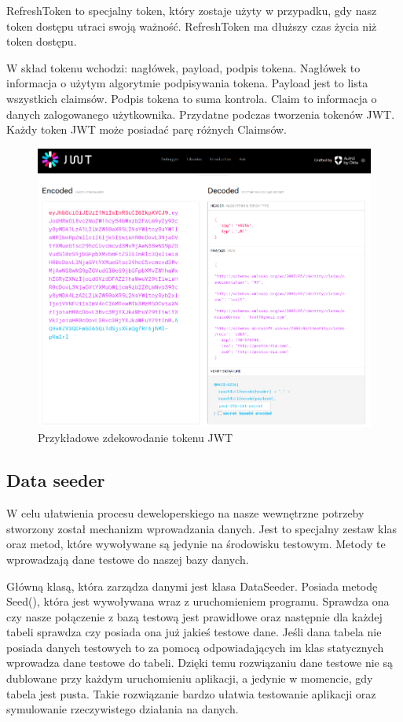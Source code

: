 \documentclass[a4paper,twoside,12pt]{book}
\begin{document}
RefreshToken to specjalny token, który zostaje użyty w przypadku, gdy nasz token dostępu utraci swoją ważność. RefreshToken ma dłuższy czas życia niż token dostępu. 

W skład tokenu wchodzi: nagłówek, payload, podpis tokena. Nagłówek to informacja o użytym algorytmie podpisywania tokena. Payload jest to lista wszystkich claimsów. Podpis tokena to suma kontrola. Claim to informacja o danych zalogowanego użytkownika. Przydatne podczas tworzenia tokenów JWT. Każdy token JWT może posiadać parę różnych Claimsów.  

\begin{figure}[H]
    \centering
    \includegraphics[width=1\textwidth]{jwtdecode.png}
    \caption{Przykładowe zdekowodanie tokenu JWT }
    \label{JWTDecode}
\end{figure}

\subsection{Data seeder} 
W celu ułatwienia procesu deweloperskiego na nasze wewnętrzne potrzeby stworzony został mechanizm wprowadzania danych. Jest to specjalny zestaw klas oraz metod, które wywoływane są jedynie na środowisku testowym. Metody te wprowadzają dane testowe do naszej bazy danych.  

Główną klasą, która zarządza danymi jest klasa DataSeeder. Posiada metodę Seed(), która jest wywoływana wraz z uruchomieniem programu. Sprawdza ona czy nasze połączenie z bazą testową jest prawidłowe oraz następnie dla każdej tabeli sprawdza czy posiada ona już jakieś testowe dane. Jeśli dana tabela nie posiada danych testowych to za pomocą odpowiadających im klas statycznych wprowadza dane testowe do tabeli. Dzięki temu rozwiązaniu dane testowe nie są dublowane przy każdym uruchomieniu aplikacji, a jedynie w momencie, gdy tabela jest pusta. Takie rozwiązanie bardzo ułatwia testowanie aplikacji oraz symulowanie rzeczywistego działania na danych. 
\end{document}
